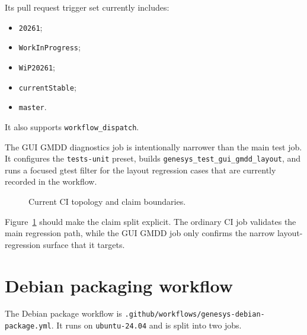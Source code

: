 Its pull request trigger set currently includes:
\begin{itemize}
\item \texttt{20261};
\item \texttt{WorkInProgress};
\item \texttt{WiP20261};
\item \texttt{currentStable};
\item \texttt{master}.
\end{itemize}
It also supports \texttt{workflow\_dispatch}.

The GUI GMDD diagnostics job is intentionally narrower than the main test job.
It configures the \texttt{tests-unit} preset, builds
\texttt{genesys\_test\_gui\_gmdd\_layout}, and runs a focused gtest filter for
the layout regression cases that are currently recorded in the workflow.

\begin{figure}[htbp]
\centering
\caption{Current CI topology and claim boundaries.}
\label{fig:packaging-ci-topology}
\end{figure}

Figure~\ref{fig:packaging-ci-topology} should make the claim split explicit.
The ordinary CI job validates the main regression path, while the GUI GMDD job
only confirms the narrow layout-regression surface that it targets.

\section{Debian packaging workflow}
\label{sec:packaging-debian-workflow}

The Debian package workflow is \texttt{.github/workflows/genesys-debian-package.yml}.
It runs on \texttt{ubuntu-24.04} and is split into two jobs.

